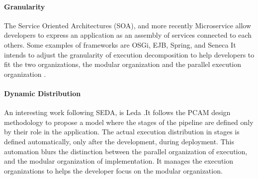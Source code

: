 
\paragraph{Granularity}

The Service Oriented Architectures (SOA), and more recently Microservice\cite{Namiot2014,Fernandez-Villamor2010,Fowler2014,Namiot2014} allow developers to express an application as an assembly of services connected to each others.
Some examples of frameworks are OSGi, EJB, Spring, and Seneca
It intends to adjust the granularity of execution decomposition to help developers to fit the two organizations, the modular organization and the parallel execution organization \cite{Adam2008}.



\paragraph{Dynamic Distribution}

An interesting work following SEDA, is Leda \cite{Salmito2013,Salmito2014}.It follows the PCAM design methodology \cite{Foster1995} to propose a model where the stages of the pipeline are defined only by their role in the application.
The actual execution distribution in stages is defined automatically, only after the development, during deployment.
This automation blurs the distinction between the parallel organization of execution, and the modular organization of implementation.
It manages the execution organizations to helps the developer focus on the modular organization.

\paragraph{}


